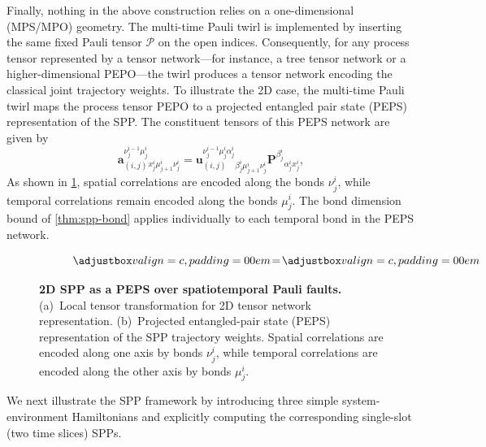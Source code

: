 Finally, nothing in the above construction relies on a one-dimensional (MPS/MPO) geometry. The multi-time Pauli twirl is implemented by inserting the same fixed Pauli tensor \(\mathcal{P}\) on the open indices. Consequently, for any process tensor represented by a tensor network---for instance, a tree tensor network or a higher-dimensional PEPO---the twirl produces a tensor network encoding the classical joint trajectory weights. To illustrate the 2D case, the multi-time Pauli twirl maps the process tensor PEPO to a projected entangled pair state (PEPS) representation of the SPP. The constituent tensors of this PEPS network are given by
\begin{equation}\label{eq:spp-peps}
  \mathbf{a}_{(i, j)}^{\nu^{i-1}_j\mu_j^i}{}_{x_j^i\mu_{j+1}^i\nu_j^i} = 
  \mathbf{u}_{(i, j)}^{\nu^{i-1}_j\mu_j^i\alpha_j^i}{}_{\beta_j^i\mu_{j+1}^i\nu_j^i}
  \mathbf{P}^{\beta_j^i}{}_{\alpha_j^i x_j^i},
\end{equation}
As shown in \cref{fig:spp-peps}, spatial correlations are encoded along the bonds \(\nu^i_j\), while temporal correlations remain encoded along the bonds \(\mu^i_j\). The bond dimension bound of \cref{thm:spp-bond} applies individually to each temporal bond in the PEPS network.
\begin{figure}
    \centering
    \begin{subfigure}{0.49\textwidth}
      \centering
      \[
      \valignboxnopad{} 
      \!=\!
      \valignboxnopad{}
      \]
      \caption{}
    \end{subfigure}
    \begin{subfigure}{0.50\textwidth}
      \centering
      
      \caption{}
    \end{subfigure}
    \caption{\textbf{2D SPP as a PEPS over spatiotemporal Pauli faults.} (a)~Local tensor transformation for 2D tensor network representation. (b)~Projected entangled-pair state (PEPS) representation of the SPP trajectory weights. Spatial correlations are encoded along one axis by bonds \(\nu^i_j\), while temporal correlations are encoded along the other axis by bonds \(\mu^i_j\).}
    \label{fig:spp-peps}
\end{figure}
We next illustrate the SPP framework by introducing three simple system-environment Hamiltonians and explicitly computing the corresponding single-slot (two time slices) SPPs.

